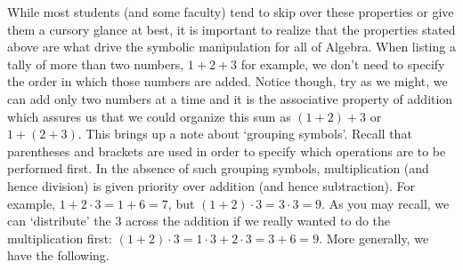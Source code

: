 
\medskip

While most students (and some faculty) tend to skip over these properties or give them a cursory glance at best, it is important to realize that the properties stated above are what drive the symbolic manipulation for all of Algebra.  When listing a tally of more than two numbers, $1 + 2 + 3$\label{howtoaddonetwothree} for example, we don't need to specify the order in which those numbers are added. Notice though, try as we might, we can add only two numbers at a time and it is the associative property of addition which assures us that we could organize this sum as $(1+2) + 3$ or $1+(2+3)$.  This brings up a note about `grouping symbols'.  Recall that parentheses and brackets are used in order to specify which operations are to be performed first.  In the absence of such grouping symbols, multiplication (and hence division) is given priority over addition (and hence subtraction). For example, $1 + 2 \cdot 3 = 1+6 = 7$, but $(1+2) \cdot 3 = 3 \cdot 3 = 9$.  As you may recall, we can `distribute' the $3$ across the addition if we really wanted to do the multiplication first:  $(1+2) \cdot 3 = 1\cdot 3 + 2 \cdot 3 = 3 + 6 = 9$. More generally, we have the following.

